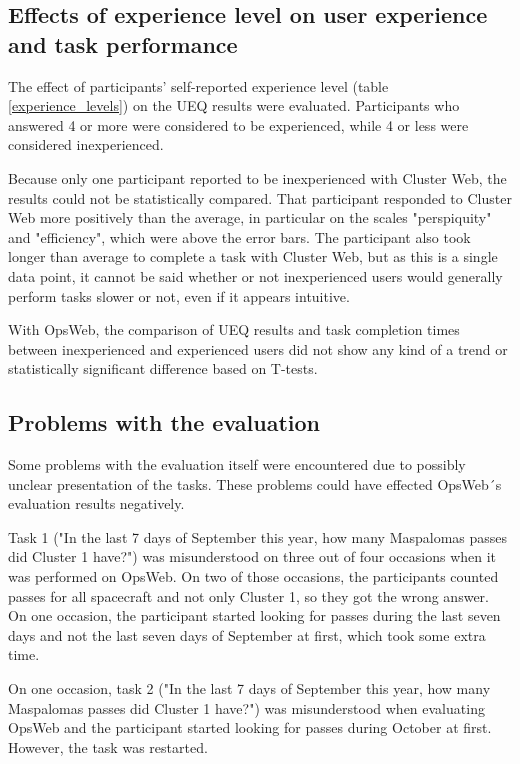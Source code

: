 \subsection{Effects of experience level on user experience and task performance}

The effect of participants' self-reported experience level (table \ref{experience_levels}) on the UEQ results were evaluated. Participants who answered 4 or more were considered to be experienced, while 4 or less were considered inexperienced.

Because only one participant reported to be inexperienced with Cluster Web, the results could not be statistically compared. That participant responded to Cluster Web more positively than the average, in particular on the scales "perspiquity" and "efficiency", which were above the error bars. The participant also took longer than average to complete a task with Cluster Web, but as this is a single data point, it cannot be said whether or not inexperienced users would generally perform tasks slower or not, even if it appears intuitive.

With OpsWeb, the comparison of UEQ results and task completion times between inexperienced and experienced users did not show any kind of a trend or statistically significant difference based on T-tests.

\subsection{Problems with the evaluation} \label{evaluation_problems}
Some problems with the evaluation itself were encountered due to possibly unclear presentation of the tasks. These problems could have effected OpsWeb´s evaluation results negatively.

Task 1 ("In the last 7 days of September this year, how many Maspalomas passes did Cluster 1 have?") was misunderstood on three out of four occasions when it was performed on OpsWeb. On two of those occasions, the participants counted passes for all spacecraft and not only Cluster 1, so they got the wrong answer. On one occasion, the participant started looking for passes during the last seven days and not the last seven days of September at first, which took some extra time.

On one occasion, task 2 ("In the last 7 days of September this year, how many Maspalomas passes did Cluster 1 have?") was misunderstood when evaluating OpsWeb and the participant started looking for passes during October at first. However, the task was restarted.

